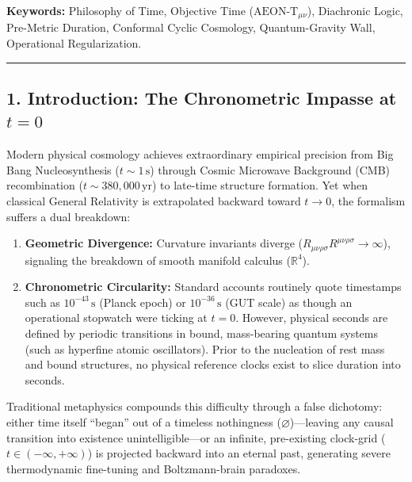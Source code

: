 \documentclass[
]{article}
\providecommand{\tightlist}{%
  \setlength{\itemsep}{0pt}\setlength{\parskip}{0pt}}
\begin{document}
\textbf{Keywords:} Philosophy of Time, Objective Time
(\(\text{AEON-T}_{\mu\nu}\)), Diachronic Logic, Pre-Metric Duration,
Conformal Cyclic Cosmology, Quantum-Gravity Wall, Operational
Regularization.

\begin{center}\rule{0.5\linewidth}{0.5pt}\end{center}

\subsection{\texorpdfstring{1. Introduction: The Chronometric Impasse at
\(t = 0\)}{1. Introduction: The Chronometric Impasse at t = 0}}\label{introduction-the-chronometric-impasse-at-t-0}

Modern physical cosmology achieves extraordinary empirical precision
from Big Bang Nucleosynthesis (\(t \sim 1\,\mathrm{s}\)) through Cosmic
Microwave Background (CMB) recombination
(\(t \sim 380{,}000\,\mathrm{yr}\)) to late-time structure formation.
Yet when classical General Relativity is extrapolated backward toward
\(t \to 0\), the formalism suffers a dual breakdown:

\begin{enumerate}
\def\labelenumi{\arabic{enumi}.}
\tightlist
\item
  \textbf{Geometric Divergence:} Curvature invariants diverge
  (\(R_{\mu\nu\rho\sigma}R^{\mu\nu\rho\sigma} \to \infty\)), signaling
  the breakdown of smooth manifold calculus (\(\mathbb{R}^4\)).
\item
  \textbf{Chronometric Circularity:} Standard accounts routinely quote
  timestamps such as \(10^{-43}\,\mathrm{s}\) (Planck epoch) or
  \(10^{-36}\,\mathrm{s}\) (GUT scale) as though an operational
  stopwatch were ticking at \(t = 0\). However, physical seconds are
  defined by periodic transitions in bound, mass-bearing quantum systems
  (such as hyperfine atomic oscillators). Prior to the nucleation of
  rest mass and bound structures, no physical reference clocks exist to
  slice duration into seconds.
\end{enumerate}

Traditional metaphysics compounds this difficulty through a false
dichotomy: either time itself ``began'' out of a timeless nothingness
(\(\varnothing\))---leaving any causal transition into existence
unintelligible---or an infinite, pre-existing clock-grid
(\(t \in (-\infty, +\infty)\)) is projected backward into an eternal
past, generating severe thermodynamic fine-tuning and Boltzmann-brain
paradoxes.
\end{document}
